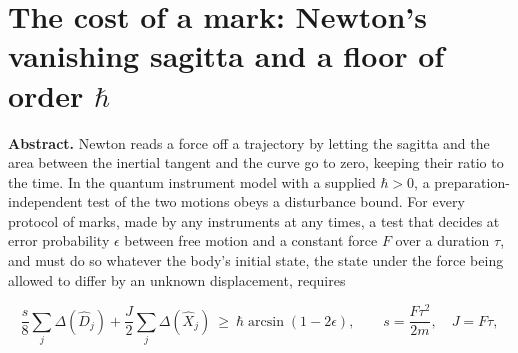 \documentclass[11pt,a4paper]{article}
\begin{document}
\hypertarget{the-cost-of-a-mark-newtons-vanishing-sagitta-and-a-floor-of-order-hbar}{%
\section{\texorpdfstring{The cost of a mark: Newton's vanishing sagitta
and a floor of order
\(\hbar\)}{The cost of a mark: Newton's vanishing sagitta and a floor of order \textbackslash hbar}}\label{the-cost-of-a-mark-newtons-vanishing-sagitta-and-a-floor-of-order-hbar}}

\textbf{Abstract.} Newton reads a force off a trajectory by letting the
sagitta and the area between the inertial tangent and the curve go to
zero, keeping their ratio to the time. In the quantum instrument model
with a supplied \(\hbar>0\), a preparation-independent test of the two
motions obeys a disturbance bound. For every protocol of marks, made by
any instruments at any times, a test that decides at error probability
\(\epsilon\) between free motion and a constant force \(F\) over a
duration \(\tau\), and must do so whatever the body's initial state, the
state under the force being allowed to differ by an unknown
displacement, requires

\[\frac s8\sum_j\Delta(\hat D_j)+\frac J2\sum_j\Delta(\hat X_j)\ \ge\ \hbar\arcsin(1-2\epsilon),
\qquad s=\frac{F\tau^2}{2m},\quad J=F\tau,\]
\end{document}
